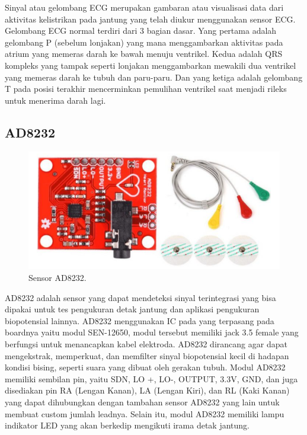 Sinyal atau gelombang ECG merupakan gambaran atau visualisasi data dari aktivitas kelistrikan pada jantung yang telah diukur menggunakan sensor ECG. Gelombang ECG normal terdiri dari 3 bagian dasar. Yang pertama adalah gelombang P (sebelum lonjakan) yang mana menggambarkan aktivitas pada atrium yang memeras darah ke bawah menuju ventrikel. Kedua adalah QRS kompleks yang tampak seperti lonjakan menggambarkan mewakili dua ventrikel yang memeras darah ke tubuh dan paru-paru. Dan yang ketiga adalah gelombang T pada posisi terakhir mencerminkan pemulihan ventrikel saat menjadi rileks untuk menerima darah lagi\cite{cit:10}.
\vspace{1ex}


\subsection{AD8232}
\vspace{1ex}
\begin{figure}[H]
	\begin{center}\centering
		\includegraphics[scale=0.7]{img/AD8232}
		\caption{Sensor AD8232.}
		\label{fig:2.1}
	\end{center}
\end{figure}

AD8232 adalah sensor yang dapat mendeteksi sinyal terintegrasi yang bisa dipakai untuk tes pengukuran detak jantung dan aplikasi pengukuran biopotensial lainnya. AD8232 menggunakan IC pada yang terpasang pada boardnya yaitu modul SEN-12650, modul tersebut memiliki jack 3.5 female yang berfungsi untuk menancapkan kabel elektroda. AD8232 dirancang agar dapat mengekstrak, memperkuat, dan memfilter sinyal biopotensial kecil di hadapan kondisi bising, seperti suara yang dibuat oleh gerakan tubuh. Modul AD8232 memiliki sembilan pin, yaitu SDN, LO +, LO-, OUTPUT, 3.3V, GND, dan juga disediakan pin RA (Lengan Kanan), LA (Lengan Kiri), dan RL (Kaki Kanan) yang dapat dihubungkan dengan tambahan sensor AD8232 yang lain untuk membuat custom jumlah leadnya. Selain itu, modul AD8232 memiliki lampu indikator LED yang akan berkedip mengikuti irama detak jantung\cite{cit:5}.
 
